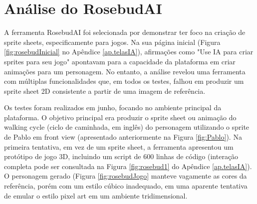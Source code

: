 \FloatBarrier
\section{Análise do RosebudAI}

A ferramenta RosebudAI foi selecionada por demonstrar ter foco na criação de sprite sheets, especificamente para jogos. Na sua página inicial (Figura \ref{fig:rosebudInicial} no Apêndice \ref{ap.telasIA}), afirmações como "Use IA para criar sprites para seu jogo" apontavam para a capacidade da plataforma em criar animações para um personagem. No entanto, a análise revelou uma ferramenta com múltiplas funcionalidades que, em todos os testes, falhou em produzir um sprite sheet 2D consistente a partir de uma imagem de referência. 

Os testes foram realizados em junho, focando no ambiente principal da plataforma. O objetivo principal era produzir o sprite sheet ou animação do walking cycle (ciclo de caminhada, em inglês) do personagem utilizando o sprite de Pablo em front view (apresentado anteriormente na Figura \ref{fig:Pablo}). Na primeira tentativa, em vez de um sprite sheet, a ferramenta apresentou um protótipo de jogo 3D, incluindo um script de 600 linhas de código (interação completa pode ser consultada na Figura \ref{fig:rosebud1} do Apêndice \ref{ap.telasIA}). O personagem gerado (Figura \ref{fig:rosebudJogo} manteve vagamente as cores da referência, porém com um estilo cúbico inadequado, em uma aparente tentativa de emular o estilo pixel art em um ambiente tridimensional.

